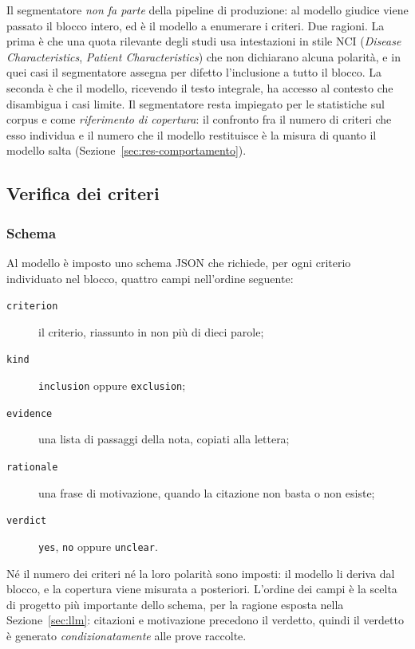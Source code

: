 \documentclass[pdflatex,sn-mathphys-num]{sn-jnl}
\theoremstyle{thmstyleone}
\theoremstyle{thmstyletwo}
\theoremstyle{thmstylethree}
\begin{document}
Il segmentatore \emph{non fa parte} della pipeline di produzione: al modello giudice viene passato il blocco intero, ed è il modello a enumerare i criteri. Due ragioni. La prima è che una quota rilevante degli studi usa intestazioni in stile NCI (\emph{Disease Characteristics}, \emph{Patient Characteristics}) che non dichiarano alcuna polarità, e in quei casi il segmentatore assegna per difetto l'inclusione a tutto il blocco. La seconda è che il modello, ricevendo il testo integrale, ha accesso al contesto che disambigua i casi limite. Il segmentatore resta impiegato per le statistiche sul corpus e come \emph{riferimento di copertura}: il confronto fra il numero di criteri che esso individua e il numero che il modello restituisce è la misura di quanto il modello salta (Sezione~\ref{sec:res-comportamento}).

\subsection{Verifica dei criteri}\label{sec:giudice}

\subsubsection{Schema}\label{sec:schema}

Al modello è imposto uno schema JSON che richiede, per ogni criterio individuato nel blocco, quattro campi nell'ordine seguente:

\begin{description}
  \item[\texttt{criterion}] il criterio, riassunto in non più di dieci parole;
  \item[\texttt{kind}] \texttt{inclusion} oppure \texttt{exclusion};
  \item[\texttt{evidence}] una lista di passaggi della nota, copiati alla lettera;
  \item[\texttt{rationale}] una frase di motivazione, quando la citazione non basta o non esiste;
  \item[\texttt{verdict}] \texttt{yes}, \texttt{no} oppure \texttt{unclear}.
\end{description}

Né il numero dei criteri né la loro polarità sono imposti: il modello li deriva dal blocco, e la copertura viene misurata a posteriori. L'ordine dei campi è la scelta di progetto più importante dello schema, per la ragione esposta nella Sezione~\ref{sec:llm}: citazioni e motivazione precedono il verdetto, quindi il verdetto è generato \emph{condizionatamente} alle prove raccolte.
\end{document}
